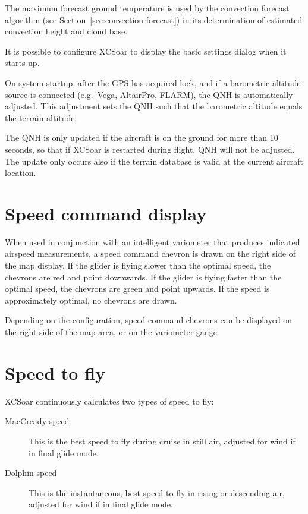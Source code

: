 The maximum forecast ground temperature is used by the convection
forecast algorithm (see Section~\ref{sec:convection-forecast}) in its
determination of estimated convection height and cloud base.

\tip It is possible to configure XCSoar to display the basic
settings dialog when it starts up.

On system startup, after the GPS has acquired lock, and if a
barometric altitude source is connected (e.g.\ Vega, AltairPro,
FLARM), the QNH is automatically adjusted.  This adjustment sets the
QNH such that the barometric altitude equals the terrain altitude.

The QNH is only updated if the aircraft is on the ground for more than
10 seconds, so that if XCSoar is restarted during flight, QNH will not
be adjusted.  The update only occurs also if the terrain database is
valid at the current aircraft location.

\section{Speed command display}

When used in conjunction with an intelligent variometer that produces
indicated airspeed measurements, a speed command chevron is drawn
on the right side of the map display.  If the glider is flying slower
than the optimal speed, the chevrons are red and point downwards.  If
the glider is flying faster than the optimal speed, the chevrons are
green and point upwards.  If the speed is approximately optimal, no
chevrons are drawn.


Depending on the configuration, speed command chevrons can be
displayed on the right side of the map area, or on the variometer
gauge.

\section{Speed to fly}

XCSoar continuously calculates two types of speed to fly:
\begin{description}
\item[MacCready speed]  This is the best speed to fly during cruise
  in still air, adjusted for wind if in final glide mode.
\item[Dolphin speed]  This is the instantaneous, best speed to fly
  in rising or descending air, adjusted for wind if in final glide
  mode.
\end{description}  

